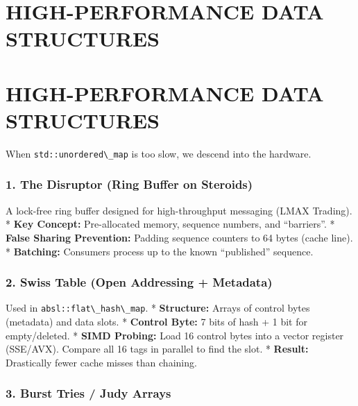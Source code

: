 \hypertarget{high-performance-data-structures}{%
\chapter{HIGH-PERFORMANCE DATA
STRUCTURES}\label{high-performance-data-structures}}

\hypertarget{high-performance-data-structures-1}{%
\chapter{HIGH-PERFORMANCE DATA
STRUCTURES}\label{high-performance-data-structures-1}}

When \passthrough{\lstinline!std::unordered\_map!} is too slow, we
descend into the hardware.

\hypertarget{the-disruptor-ring-buffer-on-steroids}{%
\subsection{1. The Disruptor (Ring Buffer on
Steroids)}\label{the-disruptor-ring-buffer-on-steroids}}

A lock-free ring buffer designed for high-throughput messaging (LMAX
Trading). * \textbf{Key Concept:} Pre-allocated memory, sequence
numbers, and ``barriers''. * \textbf{False Sharing Prevention:} Padding
sequence counters to 64 bytes (cache line). * \textbf{Batching:}
Consumers process up to the known ``published'' sequence.

\hypertarget{swiss-table-open-addressing-metadata}{%
\subsection{2. Swiss Table (Open Addressing +
Metadata)}\label{swiss-table-open-addressing-metadata}}

Used in \passthrough{\lstinline!absl::flat\_hash\_map!}. *
\textbf{Structure:} Arrays of control bytes (metadata) and data slots. *
\textbf{Control Byte:} 7 bits of hash + 1 bit for empty/deleted. *
\textbf{SIMD Probing:} Load 16 control bytes into a vector register
(SSE/AVX). Compare all 16 tags in parallel to find the slot. *
\textbf{Result:} Drastically fewer cache misses than chaining.

\hypertarget{burst-tries-judy-arrays}{%
\subsection{3. Burst Tries / Judy
Arrays}\label{burst-tries-judy-arrays}}

